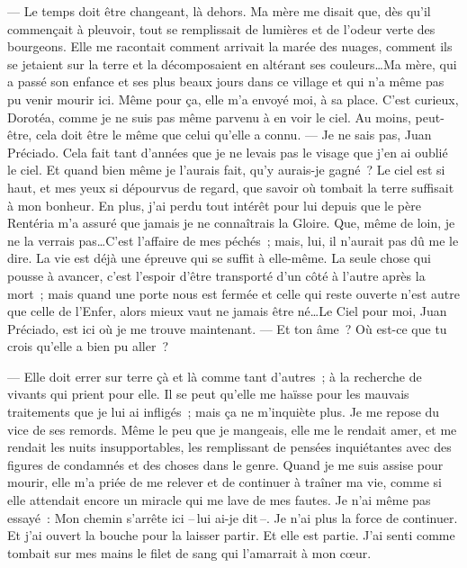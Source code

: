   --- Le temps doit être changeant, là dehors. Ma mère me disait que, dès qu’il commençait à pleuvoir, tout se remplissait de lumières et de l’odeur verte des bourgeons. Elle me racontait comment arrivait la marée des nuages, comment ils se jetaient sur la terre et la décomposaient en altérant ses couleurs\ldots Ma mère, qui a passé son enfance et ses plus beaux jours dans ce village et qui n’a même pas pu venir mourir ici. Même pour ça, elle m’a envoyé moi, à sa place. C’est curieux, Dorotéa, comme je ne suis pas même parvenu à en voir le ciel. Au moins, peut-être, cela doit être le même que celui qu’elle a connu.
\pend
%
\pstart
  --- Je ne sais pas, Juan Préciado. Cela fait tant d’années que je ne levais pas le visage que j’en ai oublié le ciel. Et quand bien même je l'aurais fait, qu’y aurais-je gagné ? Le ciel est si haut, et mes yeux si dépourvus de regard, que savoir où tombait la terre suffisait à mon bonheur. En plus, j’ai perdu tout intérêt pour lui depuis que le père Rentéria m’a assuré que jamais je ne connaîtrais la Gloire. Que, même de loin, je ne la verrais pas\ldots C’est l’affaire de mes péchés ; mais, lui, il n’aurait pas dû me le dire. La vie est déjà une épreuve qui se suffit à elle-même. La seule chose qui pousse à avancer, c’est l’espoir d’être transporté d’un côté à l’autre après la mort ; mais quand une porte nous est fermée et celle qui reste ouverte n'est autre que celle de l'Enfer, alors mieux vaut ne jamais être né\ldots Le Ciel pour moi, Juan Préciado, est ici où je me trouve maintenant.
\pend
%
\pstart
  --- Et ton âme ? Où est-ce que tu crois qu’elle a bien pu aller ?

  --- Elle doit errer sur terre çà et là comme tant d’autres ; à la recherche de vivants qui prient pour elle. Il se peut qu’elle me haïsse pour les mauvais traitements que je lui ai infligés ; mais ça ne m’inquiète plus. Je me repose du vice de ses remords. Même le peu que je mangeais, elle me le rendait amer, et me rendait les nuits insupportables, les remplissant de pensées inquiétantes avec des figures de condamnés et des choses dans le genre. Quand je me suis assise pour mourir, elle m’a priée de me relever et de continuer à traîner ma vie, comme si elle attendait encore un miracle qui me lave de mes fautes. Je n’ai même pas essayé : \og{}Mon chemin s’arrête ici --\,lui ai-je dit\,--. Je n'ai plus la force de continuer.\fg{} Et j’ai ouvert la bouche pour la laisser partir. Et elle est partie. J’ai senti comme tombait sur mes mains le filet de sang qui l’amarrait à mon cœur.
\pend
